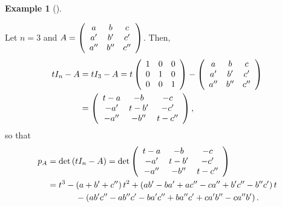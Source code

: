 \documentclass[numbers=enddot,12pt,final,onecolumn,notitlepage]{scrartcl}%
\numberwithin{exer}{subsection}
\theoremstyle{definition}
\newtheorem{exam}[theo]{Example}
\newenvironment{example}[1][]
{\begin{exam}[#1]\begin{leftbar}}
{\end{leftbar}\end{exam}}
\begin{document}
\begin{example}
\label{exa.schurtri.ch.pA.3x3}Let $n=3$ and $A=\left(
\begin{array}
[c]{ccc}%
a & b & c\\
a^{\prime} & b^{\prime} & c^{\prime}\\
a^{\prime\prime} & b^{\prime\prime} & c^{\prime\prime}%
\end{array}
\right)  $. Then,%
\begin{align*}
tI_{n}-A &  =tI_{3}-A=t\left(
\begin{array}
[c]{ccc}%
1 & 0 & 0\\
0 & 1 & 0\\
0 & 0 & 1
\end{array}
\right)  -\left(
\begin{array}
[c]{ccc}%
a & b & c\\
a^{\prime} & b^{\prime} & c^{\prime}\\
a^{\prime\prime} & b^{\prime\prime} & c^{\prime\prime}%
\end{array}
\right)  \\
&  =\left(
\begin{array}
[c]{ccc}%
t-a & -b & -c\\
-a^{\prime} & t-b^{\prime} & -c^{\prime}\\
-a^{\prime\prime} & -b^{\prime\prime} & t-c^{\prime\prime}%
\end{array}
\right)  ,
\end{align*}
so that%
\begin{align*}
p_{A} &  =\det\left(  tI_{n}-A\right)  =\det\left(
\begin{array}
[c]{ccc}%
t-a & -b & -c\\
-a^{\prime} & t-b^{\prime} & -c^{\prime}\\
-a^{\prime\prime} & -b^{\prime\prime} & t-c^{\prime\prime}%
\end{array}
\right)  \\
&  =t^{3}-\left(  a+b^{\prime}+c^{\prime\prime}\right)  t^{2}+\left(
ab^{\prime}-ba^{\prime}+ac^{\prime\prime}-ca^{\prime\prime}+b^{\prime
}c^{\prime\prime}-b^{\prime\prime}c^{\prime}\right)  t\\
&  \ \ \ \ \ \ \ \ \ \ -\left(  ab^{\prime}c^{\prime\prime}-ab^{\prime\prime
}c^{\prime}-ba^{\prime}c^{\prime\prime}+ba^{\prime\prime}c^{\prime}%
+ca^{\prime}b^{\prime\prime}-ca^{\prime\prime}b^{\prime}\right)  .
\end{align*}

\end{example}
\end{document}
